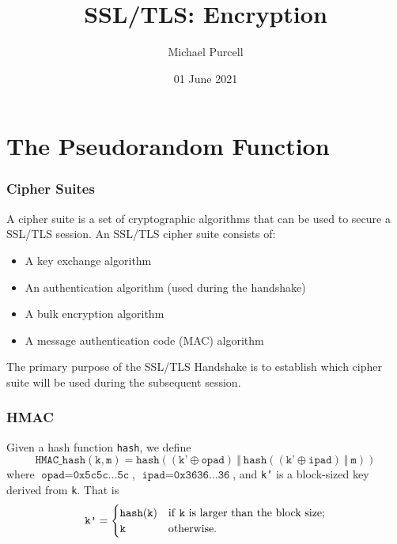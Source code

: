 \documentclass[aspectratio=169]{beamer}
\title{SSL/TLS: Encryption}
\author{Michael Purcell}
\date{01 June 2021}
\begin{document}
\begin{frame}[Roundel=siiorange]
\titlepage
\end{frame}

\section{The Pseudorandom Function}

\begin{frame}[Roundel=siiorange]
	\tocpage
\end{frame}

\begin{frame}
	\frametitle{Cipher Suites}
	A cipher suite is a set of cryptographic algorithms that can be used to secure a SSL/TLS session. An SSL/TLS cipher suite consists of:
	\begin{itemize}
		\item A key exchange algorithm
		\item An authentication algorithm (used during the handshake)
		\item A bulk encryption algorithm
		\item A message authentication code (MAC) algorithm
	\end{itemize}
	
	\vfill
	
	The primary purpose of the SSL/TLS Handshake is to establish which cipher suite will be used during the subsequent session.
\end{frame}

\begin{frame}
	\frametitle{HMAC}
	Given a hash function \texttt{hash}, we define
	\begin{equation} \nonumber
		\texttt{HMAC\_hash}(\texttt{k}, \texttt{m}) = \texttt{hash}\left((\texttt{k'} \oplus \texttt{opad}) \ \Vert \  \texttt{hash}\left((\texttt{k'} \oplus \texttt{ipad}) \ \Vert \ \texttt{m} \right)\right)
	\end{equation}
	where $\texttt{opad} = \texttt{0x5c5c\ldots 5c}$, $\texttt{ipad} = \texttt{0x3636\ldots 36}$, and \texttt{k'} is a block-sized key derived from \texttt{k}.  That is
	\begin{align*}
		\texttt{k'} &=
		\begin{cases}
			\texttt{hash}(\texttt{k}) & \text{if \texttt{k} is larger than the block size}; \\
			\texttt{k} & \text{otherwise}.
		\end{cases} \\
	\end{align*}
\end{frame}
\end{document}
